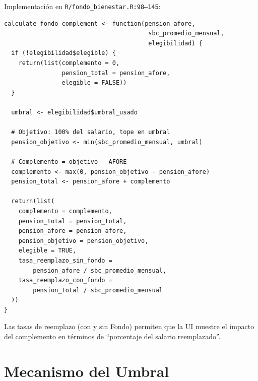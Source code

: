 \documentclass[11pt,a4paper]{report}
\begin{document}
\begin{tcolorbox}[colback=orange!5!white, colframe=orange!75!black, title=\textbf{Aplicaci\'on en C\'odigo}]
Implementaci\'on en \texttt{R/fondo\_bienestar.R:98--145}:

\begin{lstlisting}
calculate_fondo_complement <- function(pension_afore,
                                        sbc_promedio_mensual,
                                        elegibilidad) {
  if (!elegibilidad$elegible) {
    return(list(complemento = 0,
                pension_total = pension_afore,
                elegible = FALSE))
  }

  umbral <- elegibilidad$umbral_usado

  # Objetivo: 100% del salario, tope en umbral
  pension_objetivo <- min(sbc_promedio_mensual, umbral)

  # Complemento = objetivo - AFORE
  complemento <- max(0, pension_objetivo - pension_afore)
  pension_total <- pension_afore + complemento

  return(list(
    complemento = complemento,
    pension_total = pension_total,
    pension_afore = pension_afore,
    pension_objetivo = pension_objetivo,
    elegible = TRUE,
    tasa_reemplazo_sin_fondo =
        pension_afore / sbc_promedio_mensual,
    tasa_reemplazo_con_fondo =
        pension_total / sbc_promedio_mensual
  ))
}
\end{lstlisting}

Las tasas de reemplazo (con y sin Fondo) permiten que la UI muestre el impacto del complemento en t\'erminos de ``porcentaje del salario reemplazado''.
\end{tcolorbox}

\section{Mecanismo del Umbral}
\end{document}
